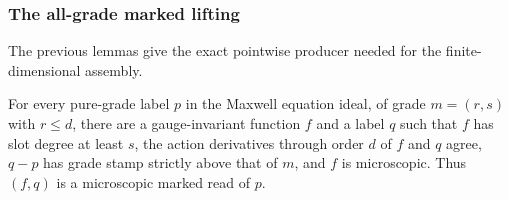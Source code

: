 \subsubsection{The all-grade marked lifting}

The previous lemmas give the exact pointwise producer needed for the
finite-dimensional assembly.

\begin{proposition}\label{prop:marked-positioned}
For every pure-grade label $p$ in the Maxwell equation ideal, of grade
$m=(r,s)$ with $r\leq d$, there are a gauge-invariant function $f$ and a
label $q$ such that $f$ has slot degree at least $s$, the action
derivatives through order $d$ of $f$ and $q$ agree, $q-p$ has grade
stamp strictly above that of $m$, and $f$ is microscopic. Thus
$(f,q)$ is a microscopic marked read of $p$.
\end{proposition}
